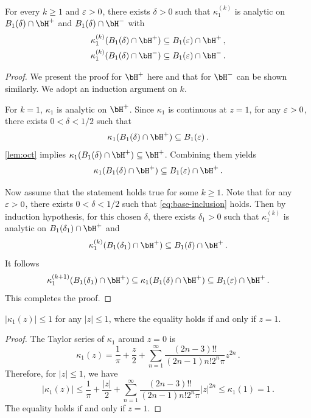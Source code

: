 \documentclass[11pt]{article}
\newcommand{\g}{\kappa_1}
\begin{document}
\begin{lemma}\label{lem:around-one}
For every $k\ge 1$ and $\varepsilon>0$, there exists $\delta>0$ such that $\g^{(k)}$ is analytic on $B_1(\delta)\cap \bH^+$ and $B_1(\delta)\cap \bH^-$ with
\begin{align*}
    \g^{(k)}(B_1(\delta)\cap \bH^+) \subseteq{}& B_1(\eps)\cap \bH^+\,,\\
     \g^{(k)}(B_1(\delta)\cap \bH^-) \subseteq{}& B_1(\eps)\cap \bH^-\,.
\end{align*}
\end{lemma}
\begin{proof}
We present the proof for $\bH^+$ here and that for $\bH^-$ can be shown similarly. We adopt an induction argument on $k$.

For $k=1$, $\g$ is analytic on $\bH^+$. Since $\g$ is continuous at $z=1$, for any $\varepsilon>0$, there exists $0<\delta<1/2$ such that \[
\g(B_1(\delta)\cap \bH^+)\subseteq B_1(\eps)\,.
\]
\cref{lem:oct} implies $\g(B_1(\delta)\cap \bH^+)\subseteq \bH^+$. Combining them yields \begin{equation}\label{eq:base-inclusion}
    \g(B_1(\delta)\cap \bH^+) \subseteq B_1(\eps)\cap \bH^+\,.
\end{equation}

Now assume that the statement holds true for some $k\ge 1$. Note that for any $\varepsilon>0$, there exists $0<\delta<1/2$ such that \eqref{eq:base-inclusion} holds. Then by induction hypothesis, for this chosen $\delta$, there exists $\delta_1>0$ such that $\g^{(k)}$ is analytic on $B_1(\delta_1)\cap \bH^+$ and \[
\g^{(k)}(B_1(\delta_1)\cap \bH^+) \subseteq B_1(\delta)\cap \bH^+\,.
\]
It follows
\[
\g^{(k+1)}(B_1(\delta_1)\cap \bH^+) \subseteq \g(B_1(\delta)\cap \bH^+)\subseteq B_1(\eps)\cap \bH^+\,.
\]
This completes the proof.
\end{proof}


\begin{lemma}\label{lem:unit-disk}
$|\g(z)|\le 1$ for any $|z|\le 1$, where the equality holds if and only if $z=1$. 
\end{lemma}

\begin{proof}
The Taylor series of $\g$ around $z=0$ is 
\[
\g(z) = \frac{1}{\pi} + \frac{z}{2} + \sum_{n=1}^\infty \frac{(2n-3)!!}{(2n-1)n!2^n \pi} z^{2n}\,.
\]
Therefore, for $|z|\le 1$, we have \[
|\g(z)| \le \frac{1}{\pi} + \frac{|z|}{2} + \sum_{n=1}^\infty \frac{(2n-3)!!}{(2n-1)n!2^n \pi} |z|^{2n} \le \g(1) = 1\,.
\]
The equality holds if and only if $z=1$. 
\end{proof}
\end{document}
